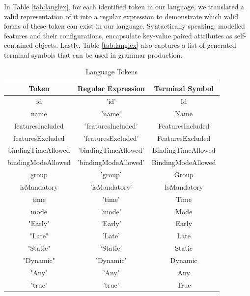 \documentclass[conference]{IEEEtran}
\begin{document}
In Table \ref{tab:langlex}, for each identified token in our language, we translated a valid representation of it into a regular expression to demonstrate which valid forms of these token can exist in our language. Syntactically speaking, modelled features and their configurations, encapsulate key-value paired attributes as self-contained objects. Lastly, Table \ref{tab:langlex} also captures a list of generated terminal symbols that can be used in grammar production.

\begin{table}[H]
\caption{Language Tokens}
\begin{center}
\begin{tabular}{c c c}
\hline
    Token & Regular Expression & Terminal Symbol \\\hline
                             id & 'id' & Id  \\\hline
                             name & 'name' & Name \\ \hline
                             featuresIncluded & 'featuresIncluded' & FeaturesIncluded\\ \hline
                             featuresExcluded & 'featuresExcluded' & FeaturesExcluded\\ \hline
                             bindingTimeAllowed & 'bindingTimeAllowed' & BindingTimeAllowed\\ \hline
                             bindingModeAllowed & 'bindingModeAllowed' & BindingModeAllowed\\\hline
                             group & 'group' & Group\\ \hline
                             isMandatory & 'isMandatory' & IsMandatory\\ \hline
                             time & 'time' & Time\\ \hline
                             mode & 'mode' & Mode\\ \hline
                              "Early" & 'Early' & Early\\ \hline
                              "Late" & 'Late' & Late\\ \hline
                              "Static" & 'Static' & Static\\ \hline
                              "Dynamic" & 'Dynamic' & Dynamic\\ \hline
                              "Any" & 'Any' & Any\\ \hline
                              "true" & 'true' & True\\ \hline

\end{tabular}
\end{center}
\end{table}
\end{document}
